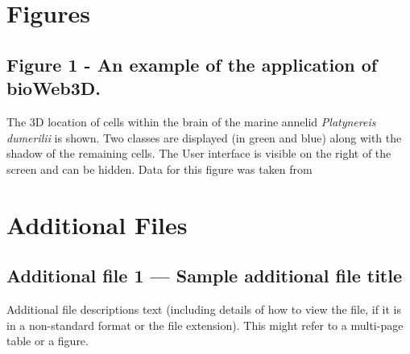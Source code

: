 \documentclass[10pt]{bmc_article}
\newenvironment{bmcformat}{\baselineskip20pt\sloppy\setboolean{publ}{false}}{\baselineskip20pt\sloppy}
\begin{document}
\begin{bmcformat}



\section*{Figures}
  \subsection*{Figure 1 - An example of the application of bioWeb3D.}
	The 3D location of cells within the brain of the marine annelid {\it{Platynereis dumerilii}} is shown. Two classes are displayed (in green and blue) along with the shadow of the remaining cells. The User interface is visible on the right of the screen and can be hidden. Data for this figure was taken from \cite{Tomer10}







\section*{Additional Files}
  \subsection*{Additional file 1 --- Sample additional file title}
    Additional file descriptions text (including details of how to
    view the file, if it is in a non-standard format or the file extension).  This might
    refer to a multi-page table or a figure.



\end{bmcformat}
\end{document}

